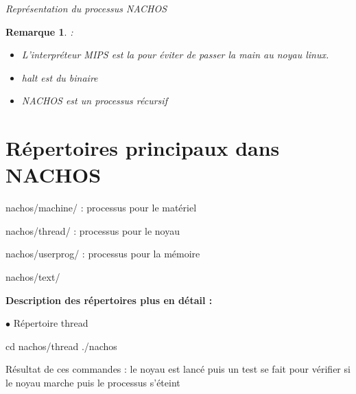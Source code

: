 \documentclass[12pt,a4paper]{report}
\newtheorem*{rem}{Remarque}
\begin{document}
\textit{Représentation du processus NACHOS}
\begin{center}
\end{center}

\begin{rem}:\\
\begin{itemize}
\item L'interpréteur MIPS est la pour éviter de passer la main au noyau linux.
\item halt est du binaire
\item NACHOS est un processus récursif
\\
\end{itemize}
\end{rem}

\section{Répertoires principaux dans NACHOS}
\begin{description}
\item nachos/machine/ : processus pour le matériel
\item nachos/thread/ : processus pour le noyau
\item nachos/userprog/ : processus pour la mémoire
\item nachos/text/
\\
\end{description}
\bigskip

\textbf{Description des répertoires plus en détail :\\}

$\bullet$ Répertoire thread
\begin{verbatimtab}
cd nachos/thread
./nachos
\end{verbatimtab}
Résultat de ces commandes : le noyau est lancé puis un test se fait pour vérifier si le noyau marche puis le processus s’éteint
\end{document}

